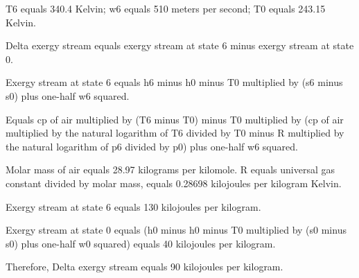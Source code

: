 T6 equals 340.4 Kelvin; w6 equals 510 meters per second; T0 equals 243.15 Kelvin.  

Delta exergy stream equals exergy stream at state 6 minus exergy stream at state 0.  

Exergy stream at state 6 equals h6 minus h0 minus T0 multiplied by (s6 minus s0) plus one-half w6 squared.  

Equals cp of air multiplied by (T6 minus T0) minus T0 multiplied by (cp of air multiplied by the natural logarithm of T6 divided by T0 minus R multiplied by the natural logarithm of p6 divided by p0) plus one-half w6 squared.  

Molar mass of air equals 28.97 kilograms per kilomole. R equals universal gas constant divided by molar mass, equals 0.28698 kilojoules per kilogram Kelvin.  

Exergy stream at state 6 equals 130 kilojoules per kilogram.  

Exergy stream at state 0 equals (h0 minus h0 minus T0 multiplied by (s0 minus s0) plus one-half w0 squared) equals 40 kilojoules per kilogram.  

Therefore, Delta exergy stream equals 90 kilojoules per kilogram.